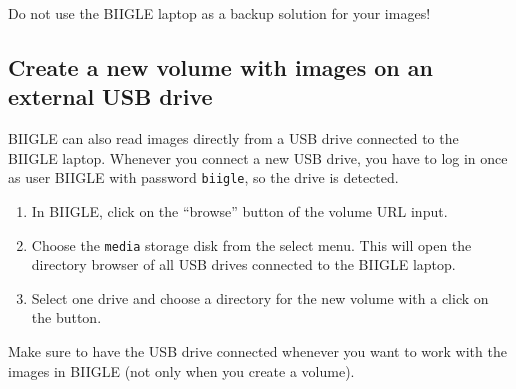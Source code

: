 Do not use the BIIGLE laptop as a backup solution for your images!

\subsection*{Create a new volume with images on an external USB drive}

BIIGLE can also read images directly from a USB drive connected to the BIIGLE laptop. Whenever you connect a new USB drive, you have to log in once as user BIIGLE with password \texttt{biigle}, so the drive is detected.

\begin{enumerate}
	\item In BIIGLE, click on the ``browse'' button of the volume URL input.
	\item Choose the \texttt{media} storage disk from the select menu. This will open the directory browser of all USB drives connected to the BIIGLE laptop.
	\item Select one drive and choose a directory for the new volume with a click on the  button.
\end{enumerate}

Make sure to have the USB drive connected whenever you want to work with the images in BIIGLE (not only when you create a volume).





